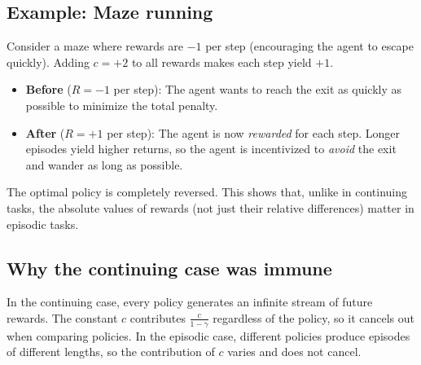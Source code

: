 \documentclass[11pt]{article}
\begin{document}
\subsection*{Example: Maze running}

Consider a maze where rewards are $-1$ per step (encouraging the agent to
escape quickly). Adding $c = +2$ to all rewards makes each step yield $+1$.

\begin{itemize}
    \item \textbf{Before} ($R = -1$ per step): The agent wants to reach the
          exit as quickly as possible to minimize the total penalty.
    \item \textbf{After} ($R = +1$ per step): The agent is now \emph{rewarded}
          for each step. Longer episodes yield higher returns, so the agent is
          incentivized to \emph{avoid} the exit and wander as long as possible.
\end{itemize}

The optimal policy is completely reversed. This shows that, unlike in continuing
tasks, the absolute values of rewards (not just their relative differences)
matter in episodic tasks.

\subsection*{Why the continuing case was immune}

In the continuing case, every policy generates an infinite stream of future
rewards. The constant $c$ contributes $\frac{c}{1-\gamma}$ regardless of the
policy, so it cancels out when comparing policies. In the episodic case,
different policies produce episodes of different lengths, so the contribution
of $c$ varies and does not cancel.
\end{document}
